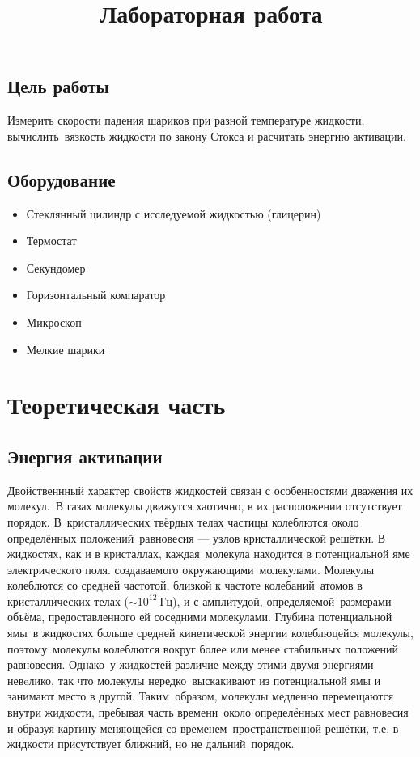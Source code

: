 \documentclass[a4paper, 12pt]{article}
\title{
  Лабораторная работа \textnumero \\
  \textbf{\textquote{\unskip}}
}
\author{}
\date{}
\begin{document}
\maketitle\thispagestyle{fancy}

\subsection*{Цель работы}
Измерить скорости падения шариков при разной температуре жидкости, вычислить\
вязкость жидкости по закону Стокса и расчитать энергию активации.

\subsection*{Оборудование}
\begin{itemize}[noitemsep]
  \item Стеклянный цилиндр с исследуемой жидкостью (глицерин)
  \item Термостат
  \item Секундомер
  \item Горизонтальный компаратор
  \item Микроскоп
  \item Мелкие шарики
\end{itemize}

\section{Теоретическая часть}
\subsection{Энергия активации}
Двойственнный характер свойств жидкостей связан с особенностями дважения их молекул.\
В газах молекулы движутся хаотично, в их расположении отсутствует порядок. В\
кристаллических твёрдых телах частицы колеблются около определённых положений\
равновесия --- узлов кристаллической решётки. В жидкостях, как и в кристаллах, каждая\
молекула находится в потенциальной яме электрического поля. создаваемого окружающими\
молекулами. Молекулы колеблются со средней частотой, близкой к частоте колебаний\
атомов в кристаллических телах ($\sim10^{12}\ Гц$), и с амплитудой, определяемой\
размерами объёма, предоставленного ей соседними молекулами. Глубина потенциальной ямы\
в жидкостях больше средней кинетической энергии колеблюцейся молекулы, поэтому\
молекулы колеблются вокруг более или менее стабильных положений равновесия. Однако\
у жидкостей различие между этими двумя энергиями невeлико, так что молекулы нередко\
выскакивают из  потенциальной ямы и занимают место в другой. Таким\
образом, молекулы медленно перемещаются внутри жидкости, пребывая часть времени\
около определённых мест равновесия и образуя картину меняющейся со временем\
пространственной решётки, т.е. в жидкости присутствует ближний, но не дальний\
порядок.
\end{document}
